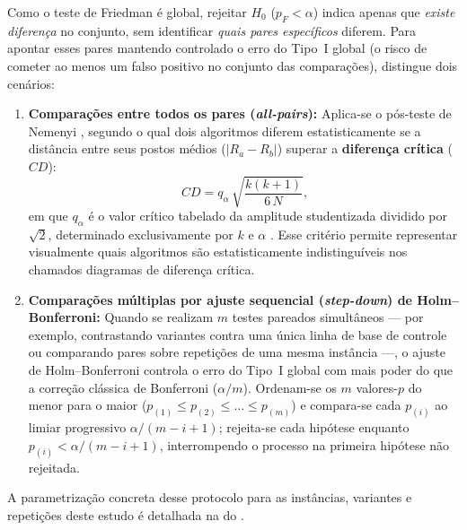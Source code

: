 Como o teste de Friedman é global, rejeitar \(H_0\) (\(p_F < \alpha\)) indica apenas que \emph{existe diferença} no conjunto, sem identificar \emph{quais pares específicos} diferem.
Para apontar esses pares mantendo controlado o erro do Tipo~I global (o risco de cometer ao menos um falso positivo no conjunto das comparações), \textcite[Seção~3.2.2]{demsar2006statistical} distingue dois cenários:
\begin{enumerate}
      \item \textbf{Comparações entre todos os pares (\emph{all-pairs}):} Aplica-se o pós-teste de Nemenyi \autocite{nemenyi1963distribution}, segundo o qual dois algoritmos diferem estatisticamente se a distância entre seus postos médios (\(|R_a - R_b|\)) superar a \textbf{diferença crítica} (\(CD\)):
            \begin{equation}\label{eq:nemenyi-cd}
                  CD = q_{\alpha}\,\sqrt{\frac{k(k + 1)}{6\,N}}\text{,}
            \end{equation}
            em que \(q_{\alpha}\) é o valor crítico tabelado da amplitude studentizada dividido por \(\sqrt{2}\), determinado exclusivamente por \(k\) e \(\alpha\) \autocite[Tabela~5]{demsar2006statistical}.
            Esse critério permite representar visualmente quais algoritmos são estatisticamente indistinguíveis nos chamados diagramas de diferença crítica.
      \item \textbf{Comparações múltiplas por ajuste sequencial (\emph{step-down}) de Holm--Bonferroni:} Quando se realizam \(m\) testes pareados simultâneos --- por exemplo, contrastando variantes contra uma única linha de base de controle ou comparando pares sobre repetições de uma mesma instância ---, o ajuste de Holm--Bonferroni \autocite{holm1979simple} controla o erro do Tipo~I global com mais poder do que a correção clássica de Bonferroni (\(\alpha/m\)).
            Ordenam-se os \(m\) valores-\(p\) do menor para o maior (\(p_{(1)} \le p_{(2)} \le \dots \le p_{(m)}\)) e compara-se cada \(p_{(i)}\) ao limiar progressivo \(\alpha / (m - i + 1)\); rejeita-se cada hipótese enquanto \(p_{(i)} < \alpha / (m - i + 1)\), interrompendo o processo na primeira hipótese não rejeitada.
\end{enumerate}

A parametrização concreta desse protocolo para as instâncias, variantes e repetições deste estudo é detalhada na  do .
